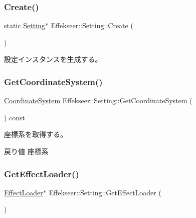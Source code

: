\subsubsection{\texorpdfstring{Create()}{Create()}}
{\footnotesize\ttfamily static \mbox{\hyperlink{class_effekseer_1_1_setting}{Setting}}$\ast$ Effekseer\+::\+Setting\+::\+Create (\begin{DoxyParamCaption}{ }\end{DoxyParamCaption})\hspace{0.3cm}{\ttfamily [static]}}



設定インスタンスを生成する。 

\mbox{\label{class_effekseer_1_1_setting_a71581209c5c2cd215b08bdf364228278}} 
\subsubsection{\texorpdfstring{Get\+Coordinate\+System()}{GetCoordinateSystem()}}
{\footnotesize\ttfamily \mbox{\hyperlink{namespace_effekseer_ac8508f8823c5fcf36aac5d2ddee23765}{Coordinate\+System}} Effekseer\+::\+Setting\+::\+Get\+Coordinate\+System (\begin{DoxyParamCaption}{ }\end{DoxyParamCaption}) const}



座標系を取得する。 

\begin{DoxyReturn}{戻り値}
座標系 
\end{DoxyReturn}
\mbox{\label{class_effekseer_1_1_setting_acc942d6e37a65418d1dd2d873fcb257d}} 
\subsubsection{\texorpdfstring{Get\+Effect\+Loader()}{GetEffectLoader()}}
{\footnotesize\ttfamily \mbox{\hyperlink{class_effekseer_1_1_effect_loader}{Effect\+Loader}}$\ast$ Effekseer\+::\+Setting\+::\+Get\+Effect\+Loader (\begin{DoxyParamCaption}{ }\end{DoxyParamCaption})}



